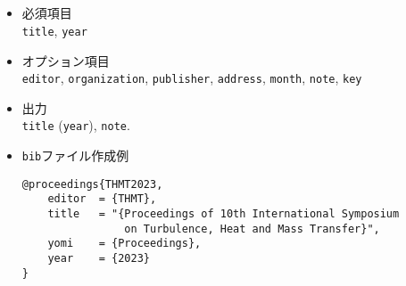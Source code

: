 \documentclass[a4paper,fleqn,uplatex,dvipdfmx]{jsarticle}
\begin{document}
\subsection{\ttproceedings}
\label{ssec:proceedings}
\begin{screen}
    \begin{itemize}
        \item 必須項目 \\
        \verb|title|, \verb|year|
        \item オプション項目 \\
        \verb|editor|, \verb|organization|, \verb|publisher|, \verb|address|, \verb|month|, \verb|note|, \verb|key|
        \item 出力 \\
            \colorbox[gray]{0.8}{\texttt{title}} (\colorbox[gray]{0.8}{\texttt{year}}), \colorbox[gray]{0.8}{\texttt{note}}.
        \item \verb|bib|ファイル作成例 \vspace{-3mm}
\begin{verbatim}
@proceedings{THMT2023,
    editor  = {THMT},
    title   = "{Proceedings of 10th International Symposium 
                on Turbulence, Heat and Mass Transfer}",
    yomi    = {Proceedings},
    year    = {2023}
}
\end{verbatim}
    \end{itemize}
\end{screen}
\end{document}
